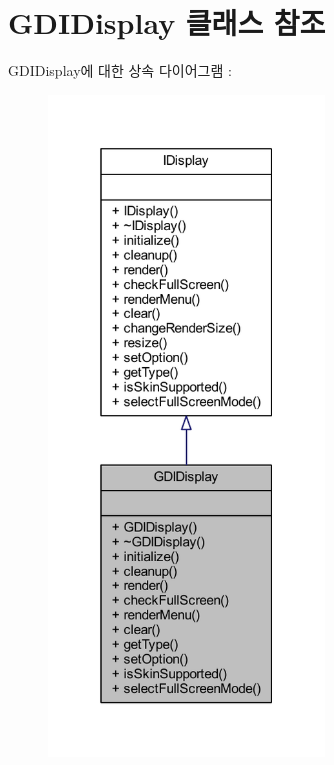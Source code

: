 \hypertarget{class_g_d_i_display}{}\section{G\+D\+I\+Display 클래스 참조}
\label{class_g_d_i_display}


G\+D\+I\+Display에 대한 상속 다이어그램 \+: \nopagebreak
\begin{figure}[H]
\begin{center}
\leavevmode
\includegraphics[width=208pt]{class_g_d_i_display__inherit__graph}
\end{center}
\end{figure}


